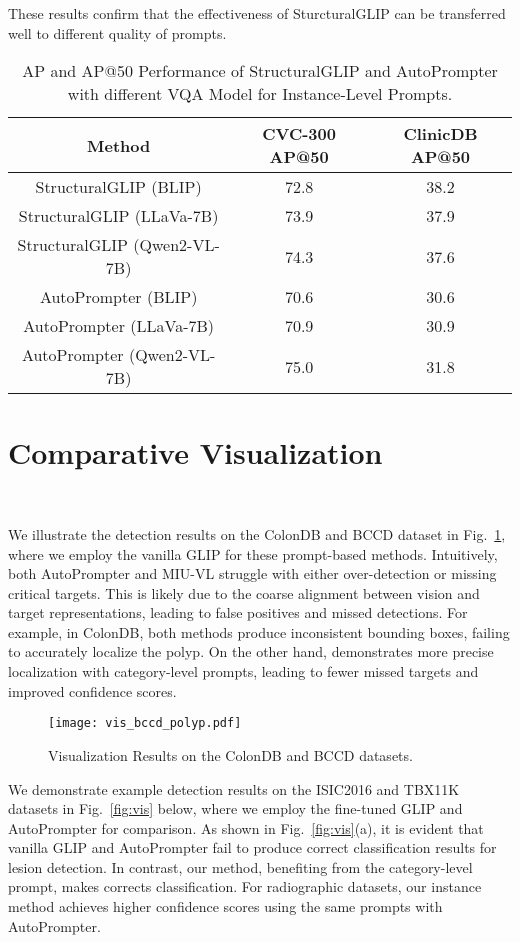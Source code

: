 These results confirm that the effectiveness of SturcturalGLIP can be transferred well to different quality of prompts.

\begin{table}[ht]
\centering
\caption{AP and AP@50 Performance of StructuralGLIP and AutoPrompter with different VQA Model for Instance-Level Prompts.}
\label{tab:compare-diff-vqa}
\begin{tabular}{ccc}
\toprule
{Method} & {CVC-300 AP@50} & {ClinicDB AP@50} \\
\toprule
{StructuralGLIP} (BLIP) & 72.8 & 38.2 \\
{StructuralGLIP} (LLaVa-7B) & 73.9 & 37.9 \\
{StructuralGLIP} (Qwen2-VL-7B) & {74.3} & {37.6} \\
\midrule
{AutoPrompter} (BLIP) & 70.6 & 30.6 \\
{AutoPrompter} (LLaVa-7B) & 70.9 & 30.9 \\
{AutoPrompter} (Qwen2-VL-7B) & 75.0 & 31.8 \\
\bottomrule
\end{tabular}
\end{table}

\section{Comparative Visualization}
~\label{sec:sample results}


We illustrate the detection results on the ColonDB and BCCD dataset in Fig.~\ref{fig:vis-bccd-polyp}, where we employ the vanilla GLIP for these prompt-based methods. Intuitively, both AutoPrompter and MIU-VL struggle with either over-detection or missing critical targets. This is likely due to the coarse alignment between vision and target representations, leading to false positives and missed detections. For example, in ColonDB, both methods produce inconsistent bounding boxes, failing to accurately localize the polyp. On the other hand, \ours demonstrates more precise localization with category-level prompts, leading to fewer missed targets and improved confidence scores.

\begin{figure}[ht]
  \centering
  \texttt{[image: vis\_bccd\_polyp.pdf]}
  \caption{Visualization Results on the ColonDB and BCCD datasets.}
  \label{fig:vis-bccd-polyp}
  \vspace{-13pt}
\end{figure}

We demonstrate example detection results on the ISIC2016 and TBX11K datasets in Fig.~\ref{fig:vis} below, where we employ the fine-tuned GLIP and AutoPrompter for comparison. As shown in Fig.~\ref{fig:vis}(a), it is evident that 
vanilla GLIP and AutoPrompter fail to produce correct classification results for lesion detection. In contrast, our method, benefiting from the category-level prompt, makes corrects classification. For radiographic datasets, our instance method achieves higher confidence scores using the same prompts with AutoPrompter.


